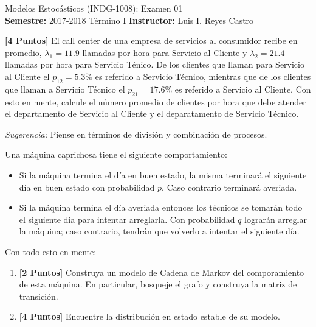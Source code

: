 \documentclass[ a4paper, twoside, 11pt]{article}
\newcommand{\numero}{01}
\begin{document}
\allowdisplaybreaks

\begin{center}
\Large Modelos Estoc\'asticos (INDG-1008): Examen \numero \\[1ex]
\small \textbf{Semestre:} 2017-2018 T\'ermino I \qquad
\textbf{Instructor:} Luis I. Reyes Castro
\end{center}
\fullskip




\begin{problem}
\textbf{[4 Puntos]} El call center de una empresa de servicios al consumidor recibe en promedio, $\lambda_1 = 11.9$ llamadas por hora para Servicio al Cliente y $\lambda_2 = 21.4$ llamadas por hora para Servicio T\'enico. De los clientes que llaman para Servicio al Cliente el $p_{12} = 5.3\%$ es referido a Servicio T\'ecnico, mientras que de los clientes que llaman a Servicio T\'ecnico el $p_{21} = 17.6\%$ es referido a Servicio al Cliente. Con esto en mente, calcule el n\'umero promedio de clientes por hora que debe atender el departamento de Servicio al Cliente y el deparatamento de Servicio T\'ecnico. 

\emph{Sugerencia:} Piense en t\'erminos de divisi\'on y combinaci\'on de procesos. 

\end{problem}
\vspace{\baselineskip}

\begin{problem}
Una m\'aquina caprichosa tiene el siguiente comportamiento: 
\begin{itemize}
\item Si la m\'aquina termina el d\'ia en buen estado, la misma terminar\'a el siguiente d\'ia en buen estado con probabilidad $p$. Caso contrario terminar\'a averiada. 
\item Si la m\'aquina termina el d\'ia averiada entonces los t\'ecnicos se tomar\'an todo el siguiente d\'ia para intentar arreglarla. Con probabilidad $q$ lograr\'an arreglar la m\'aquina; caso contrario, tendr\'an que volverlo a intentar el siguiente d\'ia. 
\end{itemize}

Con todo esto en mente: 
\begin{enumerate}[label=\alph*.]
\item \textbf{[2 Puntos]} Construya un modelo de Cadena de Markov del comporamiento de esta m\'aquina. En particular, bosqueje el grafo y construya la matriz de transici\'on. 
\item \textbf{[4 Puntos]} Encuentre la distribuci\'on en estado estable de su modelo. 
\end{enumerate}

\end{problem}
\vspace{\baselineskip}
\end{document}
